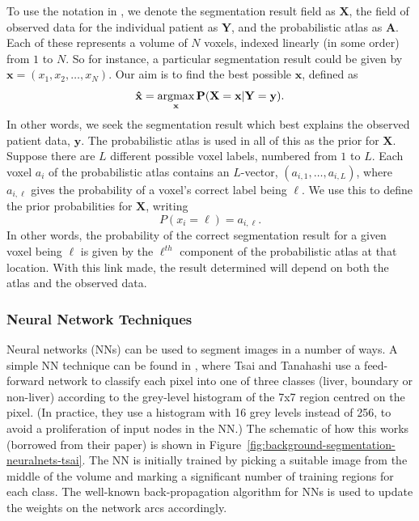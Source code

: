To use the notation in \cite{park03}, we denote the segmentation result field as $\mathbf{X}$, the field of observed data for the individual patient as $\mathbf{Y}$, and the probabilistic atlas as $\mathbf{A}$. Each of these represents a volume of $N$ voxels, indexed linearly (in some order) from $1$ to $N$. So for instance, a particular segmentation result could be given by $\mathbf{x} = (x_1, x_2, \ldots, x_N)$. Our aim is to find the best possible $\mathbf{x}$, defined as
%
\[
\mathbf{\hat{x}} = \mathop{\rm argmax}_{\mathbf{x}} \mathbf{P}(\mathbf{X} = \mathbf{x} | \mathbf{Y} = \mathbf{y}).
\]
%
In other words, we seek the segmentation result which best explains the observed patient data, $\mathbf{y}$. The probabilistic atlas is used in all of this as the prior for $\mathbf{X}$. Suppose there are $L$ different possible voxel labels, numbered from $1$ to $L$. Each voxel $a_i$ of the probabilistic atlas contains an $L$-vector, $(a_{i,1}, \ldots, a_{i,L})$, where $a_{i,\ell}$ gives the probability of a voxel's correct label being $\ell$. We use this to define the prior probabilities for $\mathbf{X}$, writing
%
\[
P(x_i = \ell) = a_{i,\ell}.
\]
%
In other words, the probability of the correct segmentation result for a given voxel being $\ell$ is given by the $\ell^{th}$ component of the probabilistic atlas at that location. With this link made, the result determined will depend on both the atlas and the observed data.


\subsubsection{Neural Network Techniques}


Neural networks (NNs) can be used to segment images in a number of ways. A simple NN technique can be found in \cite{tsai94}, where Tsai and Tanahashi use a feed-forward network to classify each pixel into one of three classes (liver, boundary or non-liver) according to the grey-level histogram of the 7x7 region centred on the pixel. (In practice, they use a histogram with 16 grey levels instead of 256, to avoid a proliferation of input nodes in the NN.) The schematic of how this works (borrowed from their paper) is shown in Figure~\ref{fig:background-segmentation-neuralnets-tsai}. The NN is initially trained by picking a suitable image from the middle of the volume and marking a significant number of training regions for each class. The well-known back-propagation algorithm for NNs \cite{aima} is used to update the weights on the network arcs accordingly.

